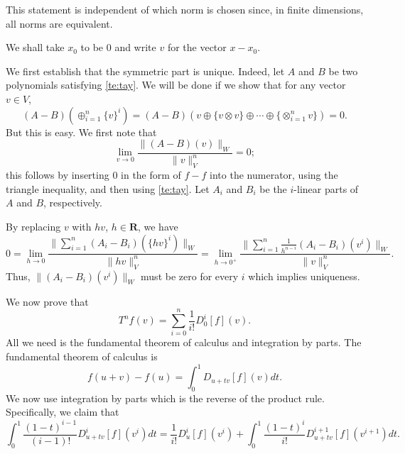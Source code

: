 \documentclass[11pt]{article}
\theoremstyle{remark}
\begin{document}
This statement is
independent of which norm is chosen since, in finite dimensions, all
norms are equivalent.

We shall take $x_0$ to be 0 and
write $v$ for the vector $x-x_0$. 


We first establish that the symmetric part is unique. Indeed,
let $A$ and $B$ be two polynomials satisfying \eqref{te:tay}. We will be
done if we show that for any vector $v \in V$, 
\[(A-B)(\oplus_{i=1}^n \{v\}^i) = 
(A-B)(v \oplus \{v\otimes v\} \oplus \dotsb \oplus \{\otimes_{i=1}^n v
 \})
 = 0. \] 
 But this is easy. We first note that 
\begin{equation} \label{te:unt}
\lim_{v \to 0} 
\frac{\lVert (A-B)(v) \rVert_W } 
{\lVert v \rVert_V^{n}} = 0;
\end{equation}
this follows by inserting 0 in the form of $f-f$ into the numerator, 
using the triangle inequality, and then using \eqref{te:tay}.
Let $A_i$ and $B_i$ be the $i$-linear parts of $A$ and $B$,
respectively. 


By replacing $v$ with
$hv$, $h \in \mathbf{R}$, we have 
\begin{equation} 
0 = \lim_{h \to 0} 
\frac{\lVert \sum_{i=1}^n (A_i-B_i)(\{hv\}^i) \rVert_W } 
{\lVert hv \rVert_V^{n}}  = \lim_{h \to 0^+} 
\frac{ \lVert \sum_{i=1}^n \frac{1}{h^{n-i}} (A_i-B_i)(v^i) \rVert_W } 
{ \lVert v \rVert_V^{n}}.
\end{equation}
Thus, $\lVert (A_i-B_i)(v^i) \rVert_W$ must be zero for every $i$
which implies  uniqueness. 

We now prove that 
\[
T^n f (v) = \sum_{i=0}^n \frac{1}{i!} \ensuremath{D_{0}^{i} {[f]} ({v}) }.
\] 
All we need
is the fundamental theorem of calculus and integration by parts. The
fundamental theorem of calculus is   
\[ f(u + v) - f(u) = \int_{0}^1 \ensuremath{D_{u+tv}^{} {[f]} ({v}) } dt.\]
We now use integration by parts which is the reverse of the product
rule. 
Specifically, we claim that 
\[
\int_{0}^1 \frac{(1-t)^{i-1}}{(i-1)!} \ensuremath{D_{u+tv}^{i} {[f]} ({v^{i}}) } dt = 
\frac{1}{i!} \ensuremath{D_{u}^{i} {[f]} ({v^{i}}) } + 
\int_{0}^1 \frac{(1-t)^i}{i!} \ensuremath{D_{u+tv}^{i+1} {[f]} ({v^{i+1}}) }   dt.
\]
\end{document}
